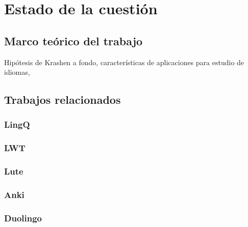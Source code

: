 \chapter{Estado de la cuestión}  

\section{Marco teórico del trabajo}

Hipótesis de Krashen a fondo, características de aplicaciones para estudio de idiomas,

\section{Trabajos relacionados}

\subsection{LingQ}

\subsection{LWT}

\subsection{Lute}

\subsection{Anki}

\subsection{Duolingo}
